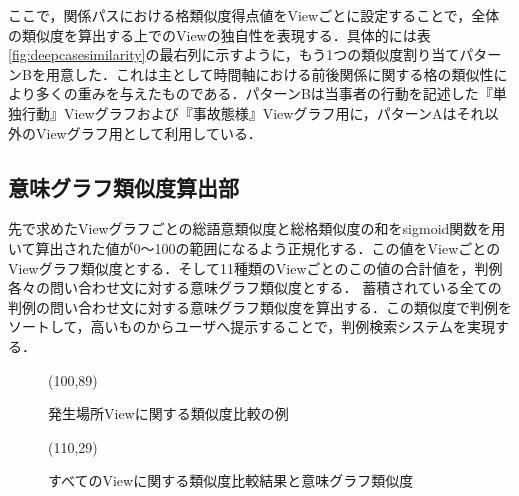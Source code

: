 ここで，関係パスにおける格類似度得点値をViewごとに設定することで，全体の類似度を算出する上でのViewの独自性を表現する．具体的には表\ref{fig:deepcasesimilarity}の最右列に示すように，もう1つの類似度割り当てパターンBを用意した．これは主として時間軸における前後関係に関する格の類似性により多くの重みを与えたものである．パターンBは当事者の行動を記述した『単独行動』Viewグラフおよび『事故態様』Viewグラフ用に，パターンAはそれ以外のViewグラフ用として利用している．

\subsection{意味グラフ類似度算出部}
先で求めたViewグラフごとの総語意類似度と総格類似度の和をsigmoid関数を用いて算出された値が0〜100の範囲になるよう正規化する．この値をViewごとのViewグラフ類似度とする．そして11種類のViewごとのこの値の合計値を，判例各々の問い合わせ文に対する意味グラフ類似度とする．
蓄積されている全ての判例の問い合わせ文に対する意味グラフ類似度を算出する．この類似度で判例をソートして，高いものからユーザへ提示することで，判例検索システムを実現する．


\begin{figure}
\begin{center}
 \atari(100,89)
 \caption{発生場所Viewに関する類似度比較の例}
 \label{fig:viewResult}
\end{center}
\end{figure}

\begin{figure}
\begin{center}
 \atari(110,29)
 \caption{すべてのViewに関する類似度比較結果と意味グラフ類似度}
 \label{fig:result}
\end{center}
\end{figure}


